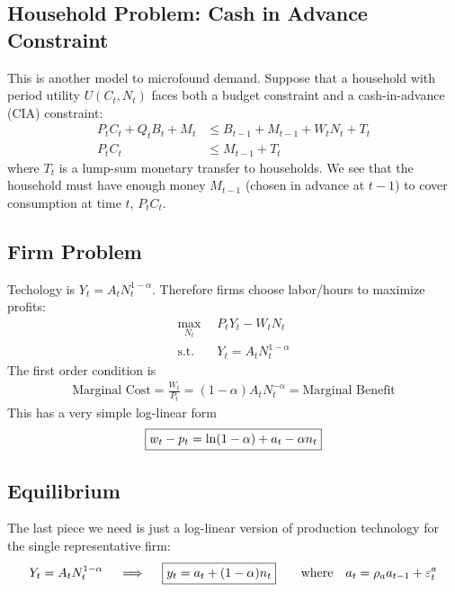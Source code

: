 \documentclass[12pt]{article}
\theoremstyle{plain}
\theoremstyle{definition}
\theoremstyle{remark}
\begin{document}
\clearpage
\subsection{Household Problem: Cash in Advance Constraint}

This is another model to microfound demand.
Suppose that a household with period utility $U(C_t,N_t)$ faces both a
budget constraint and a cash-in-advance (CIA) constraint:
\begin{align*}
  P_tC_t + Q_tB_t + M_t &\leq B_{t-1} + M_{t-1} + W_tN_t + T_t\\
  P_tC_t &\leq M_{t-1} + T_t
\end{align*}
where $T_t$ is a lump-sum monetary transfer to households.
We see that the household must have enough money $M_{t-1}$ (chosen in
advance at $t-1$) to cover consumption at time $t$, $P_tC_t$.


\clearpage
\subsection{Firm Problem}


Techology is $Y_t=A_tN_t^{1-\alpha}$. Therefore firms choose labor/hours
to maximize profits:
\begin{align*}
  \max_{N_t} \; &P_tY_t - W_tN_t \\
  \text{s.t.} \quad &Y_t =A_tN_t^{1-\alpha}
\end{align*}
The first order condition is
\begin{align*}
  \text{Marginal Cost} =
  \frac{W_t}{P_t} = (1-\alpha) A_t N_t^{-\alpha}
  = \text{Marginal Benefit}
\end{align*}
This has a very simple log-linear form
\begin{align*}
  \boxed{%
  w_t - p_t
  = \ln(1-\alpha) + a_t - \alpha n_t
  }
\end{align*}


\subsection{Equilibrium}

The last piece we need is just a log-linear version of production
technology for the single representative firm:
\begin{align*}
  Y_t = A_t N_t^{1-\alpha}
  \quad\implies\quad
  \boxed{%
  y_t = a_t + (1-\alpha)n_t
  }
  \qquad\text{where}\quad
  a_t = \rho_a a_{t-1} + \varepsilon_t^a
\end{align*}
\end{document}
